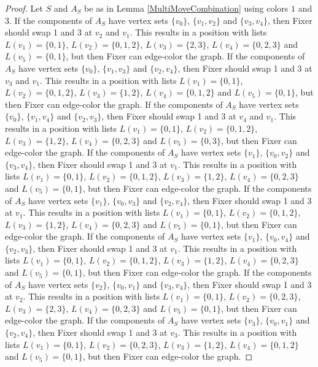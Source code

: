 \documentclass[12pt]{amsart}
\theoremstyle{plain}
\theoremstyle{definition}
\theoremstyle{remark}
\begin{document}
\begin{proof}
Let $S$ and $A_S$ be as in Lemma \ref{MultiMoveCombination} using colors $1$ and $3$. If the components of $A_S$ have vertex sets $\{v_0\}$, $\{v_1, v_2\}$ and $\{v_3, v_4\}$, then Fixer should swap 1 and 3 at $v_2$ and $v_1$. This results in a position with lists $L(v_1) = \{0, 1\}$, $L(v_2) = \{0, 1, 2\}$, $L(v_3) = \{2, 3\}$, $L(v_4) = \{0, 2, 3\}$ and $L(v_5) = \{0, 1\}$, but then Fixer can edge-color the graph.
If the components of $A_S$ have vertex sets $\{v_0\}$, $\{v_1, v_3\}$ and $\{v_2, v_4\}$, then Fixer should swap 1 and 3 at $v_3$ and $v_1$. This results in a position with lists $L(v_1) = \{0, 1\}$, $L(v_2) = \{0, 1, 2\}$, $L(v_3) = \{1, 2\}$, $L(v_4) = \{0, 1, 2\}$ and $L(v_5) = \{0, 1\}$, but then Fixer can edge-color the graph.
If the components of $A_S$ have vertex sets $\{v_0\}$, $\{v_1, v_4\}$ and $\{v_2, v_3\}$, then Fixer should swap 1 and 3 at $v_4$ and $v_1$. This results in a position with lists $L(v_1) = \{0, 1\}$, $L(v_2) = \{0, 1, 2\}$, $L(v_3) = \{1, 2\}$, $L(v_4) = \{0, 2, 3\}$ and $L(v_5) = \{0, 3\}$, but then Fixer can edge-color the graph.
If the components of $A_S$ have vertex sets $\{v_1\}$, $\{v_0, v_2\}$ and $\{v_3, v_4\}$, then Fixer should swap 1 and 3 at $v_1$. This results in a position with lists $L(v_1) = \{0, 1\}$, $L(v_2) = \{0, 1, 2\}$, $L(v_3) = \{1, 2\}$, $L(v_4) = \{0, 2, 3\}$ and $L(v_5) = \{0, 1\}$, but then Fixer can edge-color the graph.
If the components of $A_S$ have vertex sets $\{v_1\}$, $\{v_0, v_3\}$ and $\{v_2, v_4\}$, then Fixer should swap 1 and 3 at $v_1$. This results in a position with lists $L(v_1) = \{0, 1\}$, $L(v_2) = \{0, 1, 2\}$, $L(v_3) = \{1, 2\}$, $L(v_4) = \{0, 2, 3\}$ and $L(v_5) = \{0, 1\}$, but then Fixer can edge-color the graph.
If the components of $A_S$ have vertex sets $\{v_1\}$, $\{v_0, v_4\}$ and $\{v_2, v_3\}$, then Fixer should swap 1 and 3 at $v_1$. This results in a position with lists $L(v_1) = \{0, 1\}$, $L(v_2) = \{0, 1, 2\}$, $L(v_3) = \{1, 2\}$, $L(v_4) = \{0, 2, 3\}$ and $L(v_5) = \{0, 1\}$, but then Fixer can edge-color the graph.
If the components of $A_S$ have vertex sets $\{v_2\}$, $\{v_0, v_1\}$ and $\{v_3, v_4\}$, then Fixer should swap 1 and 3 at $v_2$. This results in a position with lists $L(v_1) = \{0, 1\}$, $L(v_2) = \{0, 2, 3\}$, $L(v_3) = \{2, 3\}$, $L(v_4) = \{0, 2, 3\}$ and $L(v_5) = \{0, 1\}$, but then Fixer can edge-color the graph.
If the components of $A_S$ have vertex sets $\{v_3\}$, $\{v_0, v_1\}$ and $\{v_2, v_4\}$, then Fixer should swap 1 and 3 at $v_3$. This results in a position with lists $L(v_1) = \{0, 1\}$, $L(v_2) = \{0, 2, 3\}$, $L(v_3) = \{1, 2\}$, $L(v_4) = \{0, 1, 2\}$ and $L(v_5) = \{0, 1\}$, but then Fixer can edge-color the graph.

\end{proof}
\end{document}
